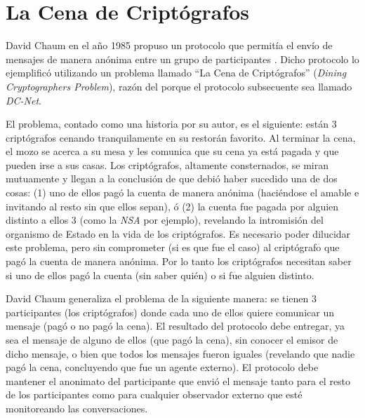\section{La Cena de Criptógrafos}

David Chaum en el año 1985 propuso un protocolo que permitía el envío de mensajes de manera anónima entre un grupo de participantes 
\cite{Chaum:1985:SWI:4372.4373, chaum1988dining}. Dicho protocolo lo ejemplificó utilizando un problema llamado ``La Cena de Criptógrafos'' 
(\emph{Dining Cryptographers Problem}), razón del porque el protocolo subsecuente sea llamado \emph{DC-Net}.

El problema, contado como una historia por su autor, es el siguiente: están 3 criptógrafos cenando tranquilamente en su restorán favorito. 
Al terminar la cena, el mozo 
se acerca a su mesa y les comunica que su cena ya está pagada y que pueden irse a sus casas. Los criptógrafos, altamente consternados, 
se miran mutuamente y llegan a la conclusión de que debió haber sucedido una de dos cosas: (1) uno de ellos pagó la cuenta de manera 
anónima (haciéndose el amable e invitando al resto sin que ellos sepan), ó (2) la cuenta fue pagada por alguien distinto a ellos 3 
(como la \emph{NSA} por ejemplo), revelando la intromisión del organismo de Estado en la vida de los criptógrafos. Es necesario poder 
dilucidar este problema, pero sin comprometer (si es que fue el caso) al criptógrafo que pagó la cuenta de manera anónima. Por lo tanto 
los criptógrafos necesitan saber si uno de ellos pagó la cuenta (sin saber quién) o si fue alguien distinto.

David Chaum generaliza el problema de la siguiente manera: se tienen 3 participantes (los criptógrafos) donde cada uno de ellos quiere 
comunicar un mensaje (pagó o no pagó la cena). El resultado del protocolo debe entregar, ya sea el mensaje de alguno de ellos 
(que pagó la cena), sin conocer el emisor de dicho mensaje, o bien que todos los mensajes fueron iguales (revelando que nadie pagó la cena, concluyendo 
que fue un agente externo). El protocolo debe mantener el anonimato del participante que envió el mensaje tanto para el resto de los 
participantes como para cualquier observador externo que esté monitoreando las conversaciones.

